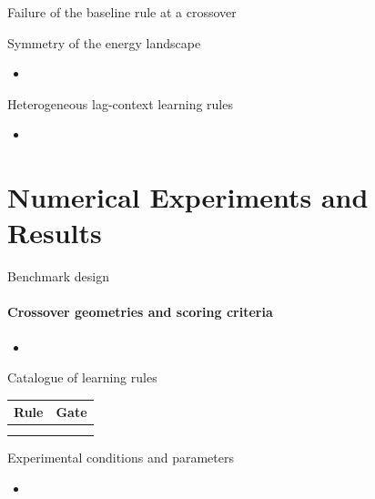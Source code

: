 \documentclass[aspectratio=169]{beamer}
\begin{document}
\begin{frame}{Failure of the baseline rule at a crossover}
  \centering
\end{frame}

\begin{frame}{Symmetry of the energy landscape}
  \begin{itemize}
    \item
  \end{itemize}
\end{frame}

\begin{frame}{Heterogeneous lag-context learning rules}
  \begin{itemize}
    \item
  \end{itemize}
\end{frame}


\section[Results]{Numerical Experiments and Results}

\begin{frame}{Benchmark design}
  \framesubtitle{Crossover geometries and scoring criteria}
  \begin{itemize}
    \item
  \end{itemize}
\end{frame}

\begin{frame}{Catalogue of learning rules}
  \centering
  \begin{tabular}{ll}
    \toprule
    Rule & Gate \\
    \midrule
     & \\
     & \\
    \bottomrule
  \end{tabular}
\end{frame}

\begin{frame}{Experimental conditions and parameters}
  \begin{itemize}
    \item
  \end{itemize}
\end{frame}
\end{document}
